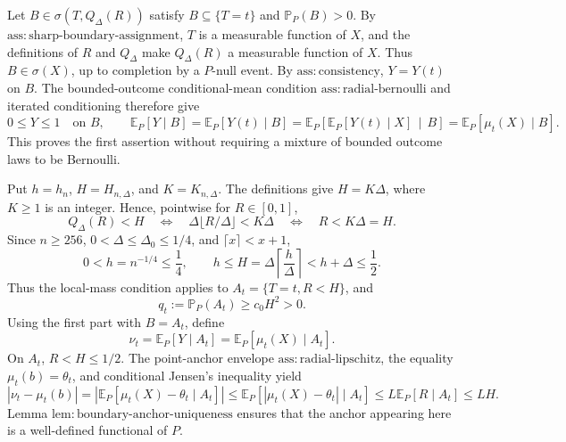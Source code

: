 Let \(B\in\sigma(T,Q_\Delta(R))\) satisfy \(B\subseteq\{T=t\}\) and \(\mathbb P_P(B)>0\).  By \(\mathrm{ass:sharp\text{-}boundary\text{-}assignment}\), \(T\) is a measurable function of \(X\), and the definitions of \(R\) and \(Q_\Delta\) make \(Q_\Delta(R)\) a measurable function of \(X\).  Thus \(B\in\sigma(X)\), up to completion by a \(P\)-null event.  By \(\mathrm{ass:consistency}\), \(Y=Y(t)\) on \(B\).  The bounded-outcome conditional-mean condition \(\mathrm{ass:radial\text{-}bernoulli}\) and iterated conditioning therefore give
\[
 0\leq Y\leq1\quad\text{on }B,
 \qquad
 \mathbb E_P[Y\mid B]
 =\mathbb E_P[Y(t)\mid B]
 =\mathbb E_P\!\left[\mathbb E_P[Y(t)\mid X]\,\middle|\,B\right]
 =\mathbb E_P[\mu_t(X)\mid B].
\]
This proves the first assertion without requiring a mixture of bounded outcome laws to be Bernoulli.

Put \(h=h_n\), \(H=H_{n,\Delta}\), and \(K=K_{n,\Delta}\).  The definitions give \(H=K\Delta\), where \(K\geq1\) is an integer.  Hence, pointwise for \(R\in[0,1]\),
\[
 Q_\Delta(R)<H
 \quad\Longleftrightarrow\quad
 \Delta\lfloor R/\Delta\rfloor<K\Delta
 \quad\Longleftrightarrow\quad
 R<K\Delta=H.
\]
Since \(n\geq256\), \(0<\Delta\leq\Delta_0\leq1/4\), and \(\lceil x\rceil<x+1\),
\[
 0<h=n^{-1/4}\leq\frac14,
 \qquad
 h\leq H=\Delta\left\lceil\frac h\Delta\right\rceil<h+\Delta\leq\frac12.
\]
Thus the local-mass condition applies to \(A_t=\{T=t,R<H\}\), and
\[
 q_t:=\mathbb P_P(A_t)\geq c_0H^2>0.
\]
Using the first part with \(B=A_t\), define
\[
 \nu_t=\mathbb E_P[Y\mid A_t]
      =\mathbb E_P[\mu_t(X)\mid A_t].
\]
On \(A_t\), \(R<H\leq1/2\).  The point-anchor envelope \(\mathrm{ass:radial\text{-}lipschitz}\), the equality \(\mu_t(b)=\theta_t\), and conditional Jensen's inequality yield
\[
 |\nu_t-\mu_t(b)|
 =\left|\mathbb E_P[\mu_t(X)-\theta_t\mid A_t]\right|
 \leq\mathbb E_P[|\mu_t(X)-\theta_t|\mid A_t]
 \leq L\mathbb E_P[R\mid A_t]
 \leq LH.
\]
Lemma \(\mathrm{lem:boundary\text{-}anchor\text{-}uniqueness}\) ensures that the anchor appearing here is a well-defined functional of \(P\).


